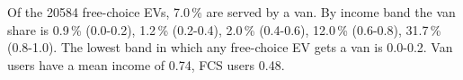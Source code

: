 Of the 20584 free-choice EVs, 7.0\,\% are served by a van. By income band the van share is 0.9\,\% (0.0-0.2), 1.2\,\% (0.2-0.4), 2.0\,\% (0.4-0.6), 12.0\,\% (0.6-0.8), 31.7\,\% (0.8-1.0). The lowest band in which any free-choice EV gets a van is 0.0-0.2. Van users have a mean income of 0.74, FCS users 0.48.
